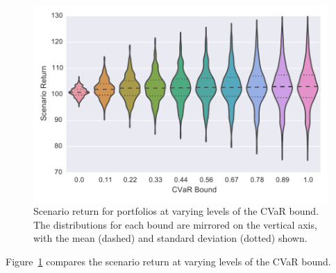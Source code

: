 \begin{figure}[tp]
\centering
\includegraphics{../pic/Scenario_Return.pdf}
\caption{Scenario return for portfolios at varying levels of the CVaR bound.
The distributions for each bound are mirrored on the vertical axis, with the mean (dashed) and standard deviation (dotted) shown.}
\label{fig:scenarioreturn}
\end{figure}

Figure~\ref{fig:scenarioreturn} compares the scenario return at varying levels of the CVaR bound.